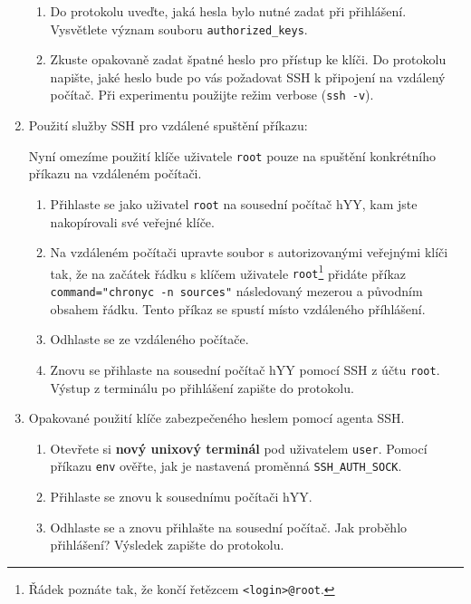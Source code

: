 \documentclass[a4paper,11pt]{article}
\begin{document}
\begin{enumerate}
\begin{enumerate}
      \item Do protokolu uveďte, jaká hesla bylo nutné zadat při přihlášení. Vysvětlete význam souboru \texttt{authorized\_keys}.
      \item Zkuste opakovaně zadat špatné heslo pro přístup ke klíči. Do protokolu napište, jaké heslo bude po vás požadovat SSH k připojení na vzdálený počítač. Při experimentu použijte režim verbose (\texttt{ssh -v}).
    \end{enumerate}

  \item Použití služby SSH pro vzdálené spuštění příkazu:
    
    Nyní omezíme použití klíče uživatele {\tt root} pouze na spuštění konkrétního příkazu na vzdáleném počítači.
    \begin{enumerate}
    \item Přihlaste se jako uživatel {\tt root} na sousední počítač hYY, kam jste nakopírovali své veřejné klíče.
    \item Na vzdáleném počítači upravte soubor s autorizovanými veřejnými klíči tak, že na začátek řádku s klíčem uživatele {\tt root}\footnote{Řádek poznáte tak, že končí řetězcem {\tt <login>@root}.} přidáte příkaz 
        \verb|command="chronyc -n sources"| následova\-ný mezerou a původním obsahem řádku. Tento příkaz se spustí místo vzdáleného příhlášení. 
      \item Odhlaste se ze vzdáleného počítače.
      \item Znovu se přihlaste na sousední počítač hYY pomocí SSH z účtu {\tt root}. Výstup z terminálu po přihlášení zapište do protokolu.
    \end{enumerate}
  \item Opakované použití klíče zabezpečeného heslem pomocí agenta SSH.
    \begin{enumerate}
      \item Otevřete si \textbf{nový unixový terminál} pod uživatelem {\tt user}. Pomocí příkazu \verb|env| ověřte, jak je nastavená proměnná \verb|SSH_AUTH_SOCK|.
      \item Přihlaste se znovu k sousednímu počítači hYY.
      \item Odhlaste se a znovu přihlašte na sousední počítač. Jak proběhlo přihlášení? Výsledek zapište do protokolu.
    \end{enumerate}
\end{enumerate}
\end{document}
